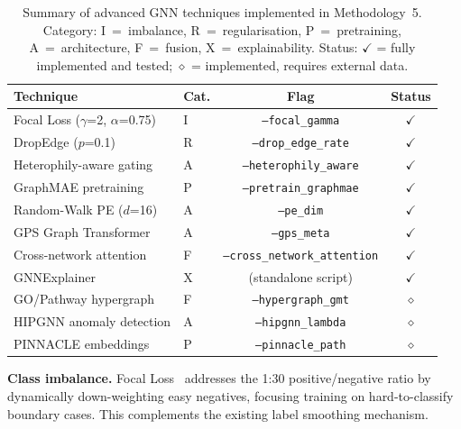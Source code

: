 \begin{table}[ht]
  \centering
  \caption{Summary of advanced GNN techniques implemented in Methodology~5.
           Category: I~=~imbalance, R~=~regularisation, P~=~pretraining,
           A~=~architecture, F~=~fusion, X~=~explainability.
           Status: $\checkmark$ = fully implemented and tested;
           $\diamond$ = implemented, requires external data.}
  \label{tab:m5_summary}
  \small
  \begin{tabular}{llcc}
    \toprule
    \textbf{Technique} & \textbf{Cat.} & \textbf{Flag} & \textbf{Status} \\
    \midrule
    Focal Loss ($\gamma$=2, $\alpha$=0.75)       & I & \texttt{--focal\_gamma}       & $\checkmark$ \\
    DropEdge ($p$=0.1)                            & R & \texttt{--drop\_edge\_rate}   & $\checkmark$ \\
    Heterophily-aware gating                      & A & \texttt{--heterophily\_aware} & $\checkmark$ \\
    GraphMAE pretraining                          & P & \texttt{--pretrain\_graphmae} & $\checkmark$ \\
    Random-Walk PE ($d$=16)                       & A & \texttt{--pe\_dim}            & $\checkmark$ \\
    GPS Graph Transformer                         & A & \texttt{--gps\_meta}          & $\checkmark$ \\
    Cross-network attention                       & F & \texttt{--cross\_network\_attention} & $\checkmark$ \\
    GNNExplainer                                  & X & (standalone script)           & $\checkmark$ \\
    GO/Pathway hypergraph                         & F & \texttt{--hypergraph\_gmt}    & $\diamond$ \\
    HIPGNN anomaly detection                      & A & \texttt{--hipgnn\_lambda}     & $\diamond$ \\
    PINNACLE embeddings                           & P & \texttt{--pinnacle\_path}     & $\diamond$ \\
    \bottomrule
  \end{tabular}
\end{table}

\textbf{Class imbalance.} Focal Loss~\cite{focal2017} addresses the 1:30 positive/negative
ratio by dynamically down-weighting easy negatives, focusing training on hard-to-classify
boundary cases. This complements the existing label smoothing mechanism.

